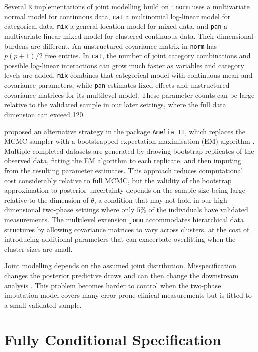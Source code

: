 Several \texttt{R} implementations of joint modelling build on \citet{schafer1997analysis}: \texttt{norm} \citep{R-norm} uses a multivariate normal model for continuous data, \texttt{cat} \citep{R-cat} a multinomial log-linear model for categorical data, \texttt{mix} \citep{R-mix} a general location model for mixed data, and \texttt{pan} \citep{R-pan} a multivariate linear mixed model for clustered continuous data. Their dimensional burdens are different. An unstructured covariance matrix in \texttt{norm} has $p(p+1)/2$ free entries. In \texttt{cat}, the number of joint category combinations and possible log-linear interactions can grow much faster as variables and category levels are added. \texttt{mix} combines that categorical model with continuous mean and covariance parameters, while \texttt{pan} estimates fixed effects and unstructured covariance matrices for its multilevel model. These parameter counts can be large relative to the validated sample in our later settings, where the full data dimension can exceed 120.

\citet{honaker2011amelia} proposed an alternative strategy in the package \texttt{Amelia II}, which replaces the MCMC sampler with a bootstrapped expectation-maximisation (EM) algorithm \citep{dempster1977maximum}. Multiple completed datasets are generated by drawing bootstrap replicates of the observed data, fitting the EM algorithm to each replicate, and then imputing from the resulting parameter estimates. This approach reduces computational cost considerably relative to full MCMC, but the validity of the bootstrap approximation to posterior uncertainty depends on the sample size being large relative to the dimension of $\theta$, a condition that may not hold in our high-dimensional two-phase settings where only $5\%$ of the individuals have validated measurements. The multilevel extension \texttt{jomo} \citep{quartagno2015jomo} accommodates hierarchical data structures by allowing covariance matrices to vary across clusters, at the cost of introducing additional parameters that can exacerbate overfitting when the cluster sizes are small.

Joint modelling depends on the assumed joint distribution. Misspecification changes the posterior predictive draws and can then change the downstream analysis \citep{meng1994multiple}. This problem becomes harder to control when the two-phase imputation model covers many error-prone clinical measurements but is fitted to a small validated sample.


\section{Fully Conditional Specification}
\label{sec:fcs}

